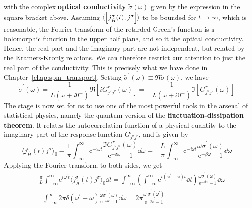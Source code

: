 with the complex \textbf{optical conductivity} \(\tilde{\sigma} (\omega )\) given by the expression in the square bracket above.
Assuming \(\langle \comm{j^{\sigma }_{\hat{H} }(t)}{j^{\sigma }} \rangle \) to be bounded for \(t \to \infty \), which is reasonable,
the Fourier transform of the retarded Green's function is a holomorphic function in the upper half plane, and so it
the optical conductivity. Hence, the real part and the imaginary part are not independent, but related by the Kramers-Kronig relations.
We can therefore restrict our attention to just the real part of the conductivity. This is precisely what we have done
in Chapter~\ref{chap:spin_transport}. Setting \(\tilde{\sigma}^{\prime}(\omega ) \equiv \Re \tilde{\sigma}(\omega )\), we have
\begin{equation}
    \tilde{\sigma}^{\prime}(\omega ) = \frac{1}{L(\omega + i 0^{+})} \Re \left[ i G^r_{j^{\sigma }j^{\sigma }}(\omega ) \right]
    = - \frac{1}{L(\omega + i 0^{+})} \Im \left[ G^r_{j^{\sigma }j^{\sigma }}(\omega ) \right]
\end{equation}
The stage is now set for us to use one of the most powerful tools in the arsenal of statistical physics, namely the
quantum version of the \textbf{fluctuation-dissipation theorem}. It relates the autocorrelation function of a physical quantity
to the imaginary part of the response function \(G^r_{j^{\sigma }j^{\sigma }}\), and is given by
\begin{equation}
    \langle j^{\sigma }_{\hat{H} }(t) j^{\sigma } \rangle_0 = \frac{1}{\pi } \int_{-\infty }^{\infty } 
    \mathrm{e}^{-i \omega  t} \frac{\Im G^r_{j^{\sigma }j^{\sigma }}(\omega )}{\mathrm{e}^{-\beta \omega } -1}\dd{\omega } 
    = -\frac{L}{\pi } \int_{-\infty }^{\infty }  \mathrm{e}^{-i \omega  t} \frac{\omega \tilde{\sigma }^{\prime} (\omega )}{\mathrm{e}^{-\beta  \omega } - 1 }\dd{\omega } 
\end{equation}
Applying the Fourier transform to both sides, we get
\begin{align}
     & -\frac{\pi}{L} \int_{-\infty }^{\infty }  \mathrm{e}^{i \omega^{\prime}  t} \langle j^{\sigma }_{\hat{H} }(t) j^{\sigma } \rangle_0 \dd{t} =
    \int_{-\infty }^{\infty }  \left(\int_{-\infty}^{\infty}  \mathrm{e}^{i(\omega^{\prime} -\omega )t} \dd{t} \right)
    \frac{\omega \tilde{\sigma}^{\prime} (\omega )}{\mathrm{e}^{-\beta \omega } - 1 }\dd{\omega } \nonumber                                                                               \\
     & =\int_{-\infty}^{\infty}  2\pi  \delta (\omega ^{\prime} -\omega  ) \frac{\omega \tilde{\sigma}^{\prime} (\omega )}{\mathrm{e}^{-\beta \omega } - 1 }\dd{\omega } 
    = 2\pi  \frac{\omega^{\prime} \tilde{\sigma}^{\prime} (\omega^{\prime} )}{\mathrm{e}^{-\beta \omega^{\prime} } - 1 }
\end{align}
